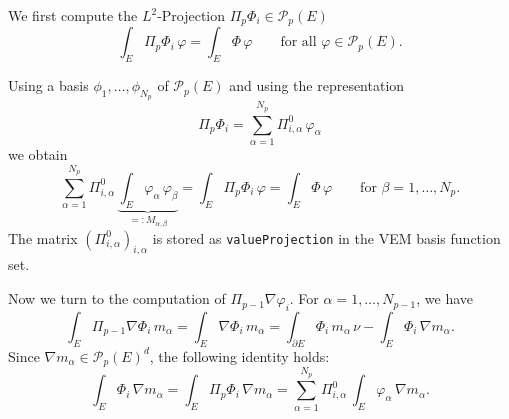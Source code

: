 \documentclass{article}
\begin{document}
We first compute the $L^2$-Projection $\Pi_p \Phi_i \in \mathcal{P}_p( E )$
\begin{equation*}
  \int_E \Pi_p \Phi_i\,\varphi = \int_E \Phi\,\varphi
  \qquad\text{for all $\varphi \in \mathcal{P}_p( E )$.}
\end{equation*}

Using a basis $\phi_1, \ldots, \phi_{N_p}$ of $\mathcal{P}_p( E )$ and using
the representation
\begin{equation*}
  \Pi_p \Phi_i = \sum_{\alpha=1}^{N_p} \Pi^0_{i,\alpha}\,\varphi_\alpha
\end{equation*}
we obtain
\begin{equation*}
  \sum_{\alpha=1}^{N_p} \Pi^0_{i, \alpha}\,\underbrace{\int_E \varphi_\alpha\,\varphi_\beta}_{=: M_{\alpha,\beta}}
  = \int_E \Pi_p \Phi_i\,\varphi
  = \int_E \Phi\,\varphi
  \qquad\text{for $\beta = 1, \ldots, N_p$.}
\end{equation*}
The matrix $(\Pi^0_{i, \alpha})_{i, \alpha}$ is stored as \texttt{valueProjection}
in the VEM basis function set.


Now we turn to the computation of $\Pi_{p-1} \nabla \varphi_i$.
For $\alpha = 1, \ldots, N_{p-1}$, we have
\begin{equation*}
  \int_E \Pi_{p-1} \nabla \Phi_i\,m_\alpha
    = \int_E \nabla \Phi_i\,m_\alpha
    = \int_{\partial E} \Phi_i\,m_\alpha\,\nu - \int_E \Phi_i\,\nabla m_\alpha.
\end{equation*}
Since $\nabla m_\alpha \in \mathcal{P}_p( E )^d$, the following identity holds:
\begin{equation*}
  \int_E \Phi_i\,\nabla m_\alpha
    = \int_E \Pi_p \Phi_i\,\nabla m_\alpha
    = \sum_{\alpha=1}^{N_p} \Pi^0_{i, \alpha}\,\int_E \varphi_\alpha\,\nabla m_\alpha.
\end{equation*}
\end{document}
